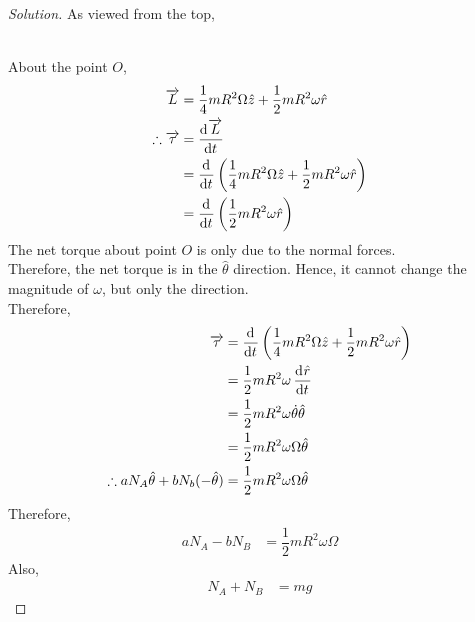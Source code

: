 \documentclass[fleqn, a4paper, 12pt]{article}
\theoremstyle{definition}
\theoremstyle{theorem}
\newenvironment{solution}
{\begin{proof}[Solution]\let\qed\relax}
	{\end{proof}}
\begin{document}
\begin{solution}
	As viewed from the top,\\
	\\
	About the point $O$,
	\begin{align*}
		\overrightarrow{L} &= \dfrac{1}{4} m R^2 \Omega \hat{z} + \dfrac{1}{2} m R^2 \omega \hat{r}\\
		\therefore \overrightarrow{\tau} &= \dod{\overrightarrow{L}}{t}\\
		&= \dod{}{t} \left( \dfrac{1}{4} m R^2 \Omega \hat{z} + \dfrac{1}{2} m R^2 \omega \hat{r} \right)\\
		&= \dod{}{t} \left( \dfrac{1}{2} m R^2 \omega \hat{r} \right)
	\end{align*}
	The net torque about point $O$ is only due to the normal forces.\\
	Therefore, the net torque is in the $\hat{\theta}$ direction. Hence, it cannot change the magnitude of $\omega$, but only the direction.\\
	Therefore,
	\begin{align*}
		\overrightarrow{\tau} &= \dod{}{t} \left( \dfrac{1}{4} m R^2 \Omega \hat{z} + \dfrac{1}{2} m R^2 \omega \hat{r} \right)\\
		&= \dfrac{1}{2} m R^2 \omega \dod{\hat{r}}{t}\\
		&= \dfrac{1}{2} m R^2 \omega \dot{\theta} \hat{\theta}\\
		&= \dfrac{1}{2} m R^2 \omega \Omega \hat{\theta}\\
		\therefore a N_A \hat{\theta} + b N_b (-\hat{\theta}) &= \dfrac{1}{2} m R^2 \omega \Omega \hat{\theta}
	\end{align*}
	Therefore,
	\begin{align*}
		a N_A - b N_B &= \dfrac{1}{2} m R^2 \omega \Omega
	\end{align*}
	Also,
	\begin{align*}
		N_A + N_B &= m g
	\end{align*}
\end{solution}
\end{document}

